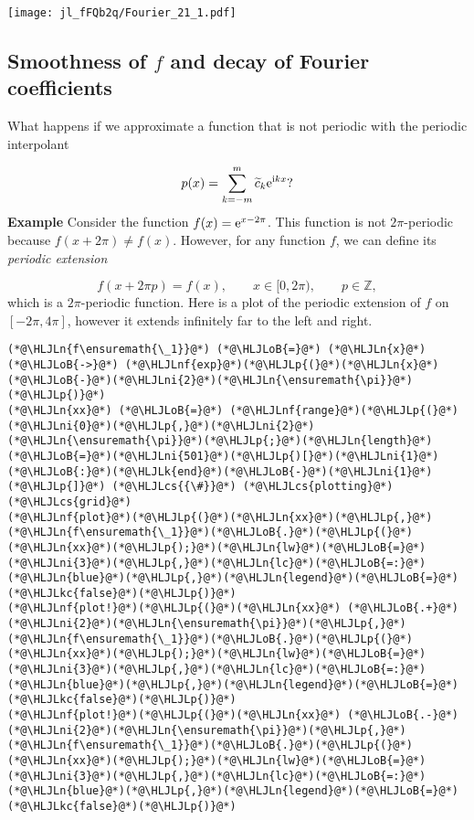 \documentclass[12pt,a4paper]{article}
\newcommand{\HLJLk}[1]{\textcolor[RGB]{148,91,176}{\textbf{#1}}}
\newcommand{\HLJLkc}[1]{\textcolor[RGB]{59,151,46}{\textit{#1}}}
\newcommand{\HLJLn}[1]{#1}
\newcommand{\HLJLnf}[1]{\textcolor[RGB]{66,102,213}{#1}}
\newcommand{\HLJLni}[1]{\textcolor[RGB]{59,151,46}{#1}}
\newcommand{\HLJLoB}[1]{\textcolor[RGB]{102,102,102}{\textbf{#1}}}
\newcommand{\HLJLp}[1]{#1}
\newcommand{\HLJLcs}[1]{\textcolor[RGB]{153,153,119}{\textit{#1}}}
\begin{document}
\texttt{[image: jl\_fFQb2q/Fourier\_21\_1.pdf]}

\subsection{Smoothness of $f$ and decay of Fourier coefficients}
What happens if we approximate a function that is not periodic with the periodic interpolant

\[
p(x) = \sum_{k=-m}^{m}\widetilde{c}_k{\rm e}^{{\rm i}kx}?
\]
\textbf{Example} Consider the function $f(x) = {\rm e}^{x-2\pi}$. This function is not  $2\pi$-periodic because $f(x + 2\pi) \neq f(x)$. However, for any function $f$, we can define its \emph{periodic extension}

\[
f(x + 2\pi p) = f(x), \qquad x \in [0, 2\pi), \qquad p \in \mathbb{Z},
\]
which is a $2\pi$-periodic function.  Here is a plot of the periodic extension of $f$ on $[-2\pi, 4\pi]$, however it extends infinitely far to the left and right.


\begin{lstlisting}
(*@\HLJLn{f\ensuremath{\_1}}@*) (*@\HLJLoB{=}@*) (*@\HLJLn{x}@*) (*@\HLJLoB{->}@*) (*@\HLJLnf{exp}@*)(*@\HLJLp{(}@*)(*@\HLJLn{x}@*)(*@\HLJLoB{-}@*)(*@\HLJLni{2}@*)(*@\HLJLn{\ensuremath{\pi}}@*)(*@\HLJLp{)}@*)
(*@\HLJLn{xx}@*) (*@\HLJLoB{=}@*) (*@\HLJLnf{range}@*)(*@\HLJLp{(}@*)(*@\HLJLni{0}@*)(*@\HLJLp{,}@*)(*@\HLJLni{2}@*)(*@\HLJLn{\ensuremath{\pi}}@*)(*@\HLJLp{;}@*)(*@\HLJLn{length}@*)(*@\HLJLoB{=}@*)(*@\HLJLni{501}@*)(*@\HLJLp{)[}@*)(*@\HLJLni{1}@*)(*@\HLJLoB{:}@*)(*@\HLJLk{end}@*)(*@\HLJLoB{-}@*)(*@\HLJLni{1}@*)(*@\HLJLp{]}@*) (*@\HLJLcs{{\#}}@*) (*@\HLJLcs{plotting}@*) (*@\HLJLcs{grid}@*)
(*@\HLJLnf{plot}@*)(*@\HLJLp{(}@*)(*@\HLJLn{xx}@*)(*@\HLJLp{,}@*)(*@\HLJLn{f\ensuremath{\_1}}@*)(*@\HLJLoB{.}@*)(*@\HLJLp{(}@*)(*@\HLJLn{xx}@*)(*@\HLJLp{);}@*)(*@\HLJLn{lw}@*)(*@\HLJLoB{=}@*)(*@\HLJLni{3}@*)(*@\HLJLp{,}@*)(*@\HLJLn{lc}@*)(*@\HLJLoB{=:}@*)(*@\HLJLn{blue}@*)(*@\HLJLp{,}@*)(*@\HLJLn{legend}@*)(*@\HLJLoB{=}@*)(*@\HLJLkc{false}@*)(*@\HLJLp{)}@*)
(*@\HLJLnf{plot!}@*)(*@\HLJLp{(}@*)(*@\HLJLn{xx}@*) (*@\HLJLoB{.+}@*) (*@\HLJLni{2}@*)(*@\HLJLn{\ensuremath{\pi}}@*)(*@\HLJLp{,}@*)(*@\HLJLn{f\ensuremath{\_1}}@*)(*@\HLJLoB{.}@*)(*@\HLJLp{(}@*)(*@\HLJLn{xx}@*)(*@\HLJLp{);}@*)(*@\HLJLn{lw}@*)(*@\HLJLoB{=}@*)(*@\HLJLni{3}@*)(*@\HLJLp{,}@*)(*@\HLJLn{lc}@*)(*@\HLJLoB{=:}@*)(*@\HLJLn{blue}@*)(*@\HLJLp{,}@*)(*@\HLJLn{legend}@*)(*@\HLJLoB{=}@*)(*@\HLJLkc{false}@*)(*@\HLJLp{)}@*)
(*@\HLJLnf{plot!}@*)(*@\HLJLp{(}@*)(*@\HLJLn{xx}@*) (*@\HLJLoB{.-}@*) (*@\HLJLni{2}@*)(*@\HLJLn{\ensuremath{\pi}}@*)(*@\HLJLp{,}@*)(*@\HLJLn{f\ensuremath{\_1}}@*)(*@\HLJLoB{.}@*)(*@\HLJLp{(}@*)(*@\HLJLn{xx}@*)(*@\HLJLp{);}@*)(*@\HLJLn{lw}@*)(*@\HLJLoB{=}@*)(*@\HLJLni{3}@*)(*@\HLJLp{,}@*)(*@\HLJLn{lc}@*)(*@\HLJLoB{=:}@*)(*@\HLJLn{blue}@*)(*@\HLJLp{,}@*)(*@\HLJLn{legend}@*)(*@\HLJLoB{=}@*)(*@\HLJLkc{false}@*)(*@\HLJLp{)}@*)
\end{lstlisting}
\end{document}
